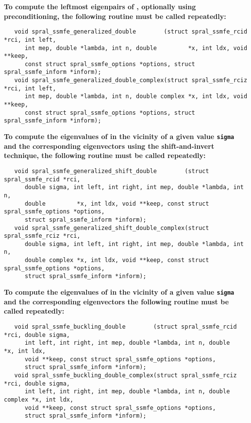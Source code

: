\medskip
\noindent
{\bf
To compute %
the leftmost eigenpairs of ,
optionally using preconditioning,
the following routine must be called repeatedly:
}
\begin{verbatim}
   void spral_ssmfe_generalized_double        (struct spral_ssmfe_rcid *rci, int left,
      int mep, double *lambda, int n, double         *x, int ldx, void **keep,
      const struct spral_ssmfe_options *options, struct spral_ssmfe_inform *inform);
   void spral_ssmfe_generalized_double_complex(struct spral_ssmfe_rciz *rci, int left,
      int mep, double *lambda, int n, double complex *x, int ldx, void **keep,
      const struct spral_ssmfe_options *options, struct spral_ssmfe_inform *inform);
\end{verbatim}

\medskip
\noindent
{\bf
To compute the eigenvalues of  %
in the vicinity of 
a given value {\tt sigma}
and the corresponding eigenvectors using the shift-and-invert technique,
the following routine must be called repeatedly:
}
\begin{verbatim}
   void spral_ssmfe_generalized_shift_double        (struct spral_ssmfe_rcid *rci,
      double sigma, int left, int right, int mep, double *lambda, int n,
      double         *x, int ldx, void **keep, const struct spral_ssmfe_options *options,
      struct spral_ssmfe_inform *inform);
   void spral_ssmfe_generalized_shift_double_complex(struct spral_ssmfe_rciz *rci,
      double sigma, int left, int right, int mep, double *lambda, int n,
      double complex *x, int ldx, void **keep, const struct spral_ssmfe_options *options,
      struct spral_ssmfe_inform *inform);
\end{verbatim}

\medskip
\noindent
{\bf
To compute the eigenvalues of  %
in the vicinity of 
a given value {\tt sigma}
and the corresponding eigenvectors %
the following routine must be called repeatedly:
}

\begin{verbatim}
   void spral_ssmfe_buckling_double        (struct spral_ssmfe_rcid *rci, double sigma,
      int left, int right, int mep, double *lambda, int n, double         *x, int ldx,
      void **keep, const struct spral_ssmfe_options *options,
      struct spral_ssmfe_inform *inform);
   void spral_ssmfe_buckling_double_complex(struct spral_ssmfe_rciz *rci, double sigma,
      int left, int right, int mep, double *lambda, int n, double complex *x, int ldx,
      void **keep, const struct spral_ssmfe_options *options,
      struct spral_ssmfe_inform *inform);
\end{verbatim}

